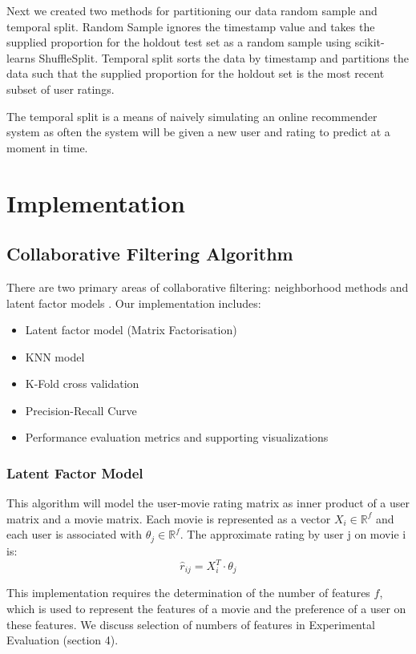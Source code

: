 \documentclass[12pt]{article}
\begin{document}
Next we created two methods for partitioning our data random sample and temporal split. Random Sample ignores the timestamp value and takes the supplied proportion for the holdout test set as a random sample using scikit-learns ShuffleSplit. Temporal split sorts the data by timestamp and partitions the data such that the supplied proportion for the holdout set is the most recent subset of user ratings. 

The temporal split is a means of naively simulating an online recommender system as often the system will be given a new user and rating to predict at a moment in time.

\section{Implementation}

\subsection{Collaborative Filtering Algorithm}
There are two primary areas of collaborative filtering: neighborhood methods and latent factor models \cite{MF}. Our implementation includes: 
\begin{itemize} 
	\item Latent factor model (Matrix Factorisation)
	\item KNN model
	\item K-Fold cross validation
	\item Precision-Recall Curve 
	\item Performance evaluation metrics and supporting visualizations
\end{itemize}

\subsubsection{Latent Factor Model}
This algorithm will model the user-movie rating matrix as inner product of a user matrix and a movie matrix. Each movie is represented as a vector $X_i \in \mathbb{R}^f$ and each user is associated with $\theta_j \in \mathbb{R}^f$. The approximate rating by user j on movie i is:
$$\hat{r}_{ij} = X_i^T \cdot \theta_j$$

This implementation requires the determination of the number of features $f$, which is used to represent the features of a movie and the preference of a user on these features. We discuss selection of numbers of features in Experimental Evaluation (section 4).
\end{document}
